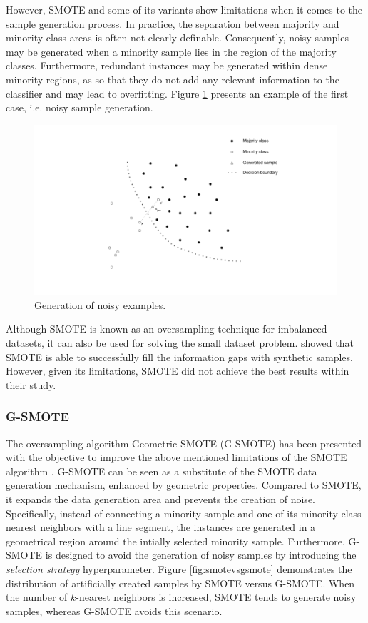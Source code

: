 \documentclass[parskip=full]{scrartcl}
\begin{document}
However, SMOTE and some of its variants show limitations when it comes to the sample generation process. In practice, the separation between majority and minority class areas is often not clearly definable. Consequently, noisy samples may be generated when a minority sample lies in the region of the majority classes. Furthermore, redundant instances may be generated within dense minority regions, as so that they do not add any relevant information to the classifier and may lead to overfitting. Figure \ref{fig:noisy-examples} presents an example of the first case, i.e. noisy sample generation.

\begin{figure}[H]
	\centering
	\includegraphics[width=1.0\linewidth]{../analysis/noisy_examples.png}
	\caption{Generation of noisy examples.}
	\label{fig:noisy-examples}
\end{figure}

Although SMOTE is known as an oversampling technique for imbalanced datasets, it can also be used for solving the small dataset problem. \cite{Li.2018} showed that SMOTE is able to successfully fill the information gaps with synthetic samples. However, given its limitations, SMOTE did not achieve the best results within their study.

\subsubsection{G-SMOTE}

The oversampling algorithm Geometric SMOTE (G-SMOTE) has been presented with the objective to improve the above mentioned limitations of the SMOTE algorithm \cite{Douzas.2019}. G-SMOTE can be seen as a substitute of the SMOTE data generation mechanism, enhanced by geometric properties. Compared to SMOTE, it expands the data generation area and prevents the creation of noise. Specifically, instead of connecting a minority sample and one of its minority class nearest neighbors with a line segment, the instances are generated in a geometrical region around the intially selected minority sample. Furthermore, G-SMOTE is designed to avoid the generation of noisy samples by introducing the \textit{selection strategy} hyperparameter. Figure \ref{fig:smotevsgsmote} demonstrates the distribution of artificially created samples by SMOTE versus G-SMOTE. When the number of \( k \)-nearest neighbors is increased, SMOTE tends to generate noisy samples, whereas G-SMOTE avoids this scenario.
\end{document}
